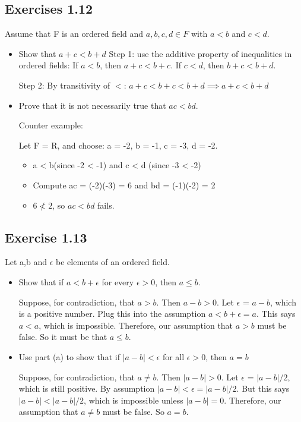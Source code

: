 \documentclass[12pt]{article}
\begin{document}
		\subsection*{Exercises 1.12}
			Assume that F is an ordered field and $a,b,c,d \in F$ with $a < b$ and $c < d$.
			\begin{itemize}
				\item Show that $a+c < b+d$
					Step 1: use the additive property of inequalities in ordered fields: If $a < b$, then $a+c<b+c$. If $c<d$, then $b+c < b+d$.
					
					Step 2: By transitivity of $<$:
					$a+c < b+c < b+d \implies a+c<b+d$
				
				\item Prove that it is not necessarily true that $ac < bd$.
				
					Counter example:
					
					Let F = R, and choose:
					a = -2, b = -1, c = -3, d = -2.
					\begin{itemize}
						\item a < b(since -2 < -1) and c < d (since -3 < -2)
						\item Compute ac = (-2)(-3) = 6 and bd = (-1)(-2) = 2
						\item $6 \nless 2$, so $ac < bd$ fails.
					\end{itemize}
			\end{itemize}
		\subsection*{Exercise 1.13}
			Let a,b and $\epsilon$ be elements of an ordered field.
			\begin{itemize}
				\item Show that if $a < b + \epsilon$ for every $\epsilon > 0$, then $a \le b$.
				
					Suppose, for contradiction, that $a > b$. Then $a - b > 0$. Let $\epsilon$ = $a - b$, which is a positive number. Plug this into the assumption $a < b + \epsilon = a$. This says $a < a$, which is impossible. Therefore, our assumption that $a > b$ must be false. So it must be that $a \le b$.
				\item Use part (a) to show that if $|a-b| < \epsilon$ for all $\epsilon > 0$, then $a = b$
				
					Suppose, for contradiction, that $a \ne b$. Then $|a-b| > 0$. Let $\epsilon$ = $|a-b|/2$, which is still positive. By assumption $|a-b| < \epsilon = |a-b|/2$. But this says $|a-b| < |a-b|/2$, which is impossible unless $|a-b| = 0$. Therefore, our assumption that $a \ne b$ must be false. So $a = b$.
			\end{itemize}
\end{document}
